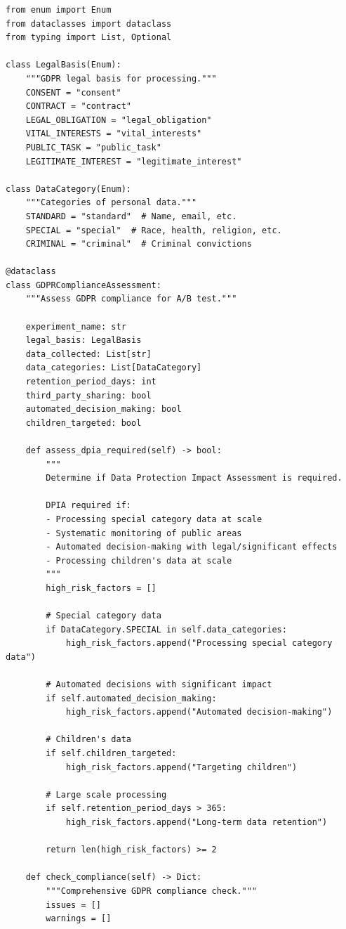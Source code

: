 \lstset{language=Python, caption=GDPR Compliance Checker}
\begin{lstlisting}
from enum import Enum
from dataclasses import dataclass
from typing import List, Optional

class LegalBasis(Enum):
    """GDPR legal basis for processing."""
    CONSENT = "consent"
    CONTRACT = "contract"
    LEGAL_OBLIGATION = "legal_obligation"
    VITAL_INTERESTS = "vital_interests"
    PUBLIC_TASK = "public_task"
    LEGITIMATE_INTEREST = "legitimate_interest"

class DataCategory(Enum):
    """Categories of personal data."""
    STANDARD = "standard"  # Name, email, etc.
    SPECIAL = "special"  # Race, health, religion, etc.
    CRIMINAL = "criminal"  # Criminal convictions

@dataclass
class GDPRComplianceAssessment:
    """Assess GDPR compliance for A/B test."""

    experiment_name: str
    legal_basis: LegalBasis
    data_collected: List[str]
    data_categories: List[DataCategory]
    retention_period_days: int
    third_party_sharing: bool
    automated_decision_making: bool
    children_targeted: bool

    def assess_dpia_required(self) -> bool:
        """
        Determine if Data Protection Impact Assessment is required.

        DPIA required if:
        - Processing special category data at scale
        - Systematic monitoring of public areas
        - Automated decision-making with legal/significant effects
        - Processing children's data at scale
        """
        high_risk_factors = []

        # Special category data
        if DataCategory.SPECIAL in self.data_categories:
            high_risk_factors.append("Processing special category data")

        # Automated decisions with significant impact
        if self.automated_decision_making:
            high_risk_factors.append("Automated decision-making")

        # Children's data
        if self.children_targeted:
            high_risk_factors.append("Targeting children")

        # Large scale processing
        if self.retention_period_days > 365:
            high_risk_factors.append("Long-term data retention")

        return len(high_risk_factors) >= 2

    def check_compliance(self) -> Dict:
        """Comprehensive GDPR compliance check."""
        issues = []
        warnings = []


\end{lstlisting}
